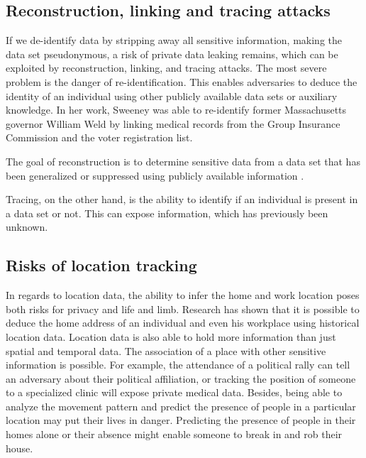 \subsection{Reconstruction, linking and tracing attacks}
If we de-identify data by stripping away all sensitive information, making the data set pseudonymous, a risk of private data leaking remains, which can be exploited by reconstruction, linking, and tracing attacks. The most severe problem is the danger of re-identification.
This enables adversaries to deduce the identity of an individual using other publicly available data sets or auxiliary knowledge. 
In her work, Sweeney \cite{DBLP:journals/ijufks/Sweene02} was able to re-identify former Massachusetts governor William Weld by linking medical records from the Group Insurance Commission and the voter registration list.

 The goal of reconstruction is to determine sensitive data from a data set that has been generalized or suppressed using publicly available information \cite{DBLP:journals/fttcs/DworkR14}. 
 
Tracing, on the other hand, is the ability to identify if an individual is present in a data set or not. This can expose information, which has previously been unknown.

\subsection{Risks of location tracking}
In regards to location data, the ability to infer the home and work location poses both risks for privacy and life and limb. Research \cite{DBLP:conf/pervasive/Krumm07}\cite{DBLP:journals/corr/abs-1901-00897}\cite{DBLP:conf/pervasive/GolleP09} has shown that it is possible to deduce the home address of an individual and even his workplace using historical location data.
Location data is also able to hold more information than just spatial and temporal data. The association of a place with other sensitive information is possible. For example, the attendance of a political rally can tell an adversary about their political affiliation, or tracking the position of someone to a specialized clinic will expose private medical data.
Besides, being able to analyze the movement pattern and predict the presence of people in a particular location may put their lives in danger. Predicting the presence of people in their homes alone or their absence might enable someone to break in and rob their house.

